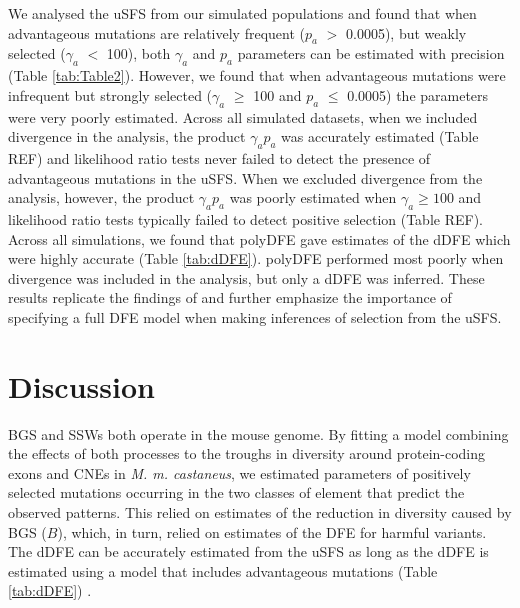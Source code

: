 \documentclass[11pt]{article}
\begin{document}
	 We analysed the uSFS from our simulated populations and found that when advantageous mutations are relatively frequent ($p_a$ $>$ 0.0005), but weakly selected ($\gamma_a$ $<$ 100), both $\gamma_a$ and $p_a$ parameters can be estimated with precision (Table \ref{tab:Table2}). However, we found that when advantageous mutations were infrequent but strongly selected ($\gamma_a$ $\geq$ 100 and $p_a$ $\leq$ 0.0005) the parameters were very poorly estimated. Across all simulated datasets, when we included divergence in the analysis, the product $\gamma_a p_a$ was accurately estimated (Table REF) and likelihood ratio tests never failed to detect the presence of advantageous mutations in the uSFS. When we excluded divergence from the analysis, however, the product  $\gamma_a p_a$  was poorly estimated when $\gamma_a \geq 100$ and likelihood ratio tests typically failed to detect positive selection (Table REF). Across all simulations, we found that polyDFE gave estimates of the dDFE which were highly accurate (Table \ref{tab:dDFE}). polyDFE performed most poorly when divergence was included in the analysis, but only a dDFE was inferred. These results replicate the findings of \cite{RN354} and further emphasize the importance of specifying a full DFE model when making inferences of selection from the uSFS. 

%
%

\section*{Discussion}

	BGS and SSWs both operate in the mouse genome. By fitting a model combining the effects of both processes to the troughs in diversity around protein-coding exons and CNEs in \textit{M. m. castaneus}, we estimated parameters of positively selected mutations occurring in the two classes of element that predict the observed patterns. This relied on estimates of the reduction in diversity caused by BGS ($B$), which, in turn, relied on estimates of the DFE for harmful variants. The dDFE can be accurately estimated from the uSFS as long as the dDFE is estimated using a model that includes advantageous mutations (Table \ref{tab:dDFE}) \citep{RN354}. 
\end{document}
